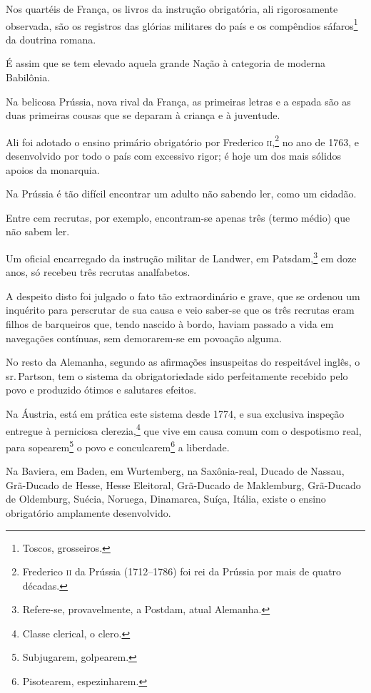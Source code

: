 Nos quartéis de França, os livros da instrução obrigatória, ali
rigorosamente observada, são os registros das glórias militares do país
e os compêndios sáfaros\footnote{Toscos, grosseiros.} da doutrina
romana.

É assim que se tem elevado aquela grande Nação à categoria de moderna
Babilônia.

Na belicosa Prússia, nova rival da França, as primeiras letras e a
espada são as duas primeiras cousas que se deparam à criança e à
juventude.

Ali foi adotado o ensino primário obrigatório por Frederico
\textsc{ii},\footnote{Frederico \textsc{ii} da Prússia (1712--1786) foi rei da Prússia por
  mais de quatro décadas.} no ano de 1763, e desenvolvido por todo o
país com excessivo rigor; é hoje um dos mais sólidos apoios da
monarquia.

Na Prússia é tão difícil encontrar um adulto não sabendo ler, como um
cidadão.

Entre cem recrutas, por exemplo, encontram-se apenas três (termo médio) que
não sabem ler.

Um oficial encarregado da instrução militar de Landwer, em
Patsdam,\footnote{Refere-se, provavelmente, a Postdam, atual Alemanha.}
em doze anos, só recebeu três recrutas analfabetos.

A despeito disto foi julgado o fato tão extraordinário e grave, que se
ordenou um inquérito para perscrutar de sua causa e veio saber-se que os
três recrutas eram filhos de barqueiros que, tendo nascido à bordo,
haviam passado a vida em navegações contínuas, sem demorarem-se em
povoação alguma.

No resto da Alemanha, segundo as afirmações insuspeitas do respeitável
inglês, o sr.\,Partson, tem o sistema da obrigatoriedade sido
perfeitamente recebido pelo povo e produzido ótimos e salutares efeitos.

Na Áustria, está em prática este sistema desde 1774, e sua exclusiva
inspeção entregue à perniciosa clerezia,\footnote{Classe clerical, o
  clero.} que vive em causa comum com o despotismo real, para
sopearem\footnote{Subjugarem, golpearem.} o povo e
conculcarem\footnote{Pisotearem, espezinharem.} a liberdade.

Na Baviera, em Baden, em Wurtemberg, na Saxônia-real, Ducado de Nassau,
Grã-Ducado de Hesse, Hesse Eleitoral, Grã-Ducado de Maklemburg,
Grã-Ducado de Oldemburg, Suécia, Noruega, Dinamarca, Suíça, Itália,
existe o ensino obrigatório amplamente desenvolvido.

